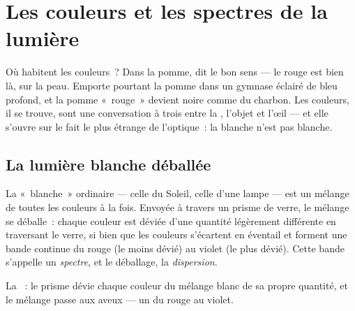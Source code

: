 \chapter{Les couleurs et les spectres de la lumière}\label{ch:g8:colors-spectra}

Où habitent les couleurs~? Dans la pomme, dit le bon sens --- le rouge
est bien là, sur la peau. Emporte pourtant la pomme dans un gymnase
éclairé de bleu profond, et la pomme «~rouge~» devient noire comme du
charbon. Les couleurs, il se trouve, sont une conversation à trois
entre la , l'objet et l'œil --- et elle s'ouvre sur le fait le
plus étrange de l'optique~: la  blanche n'est pas blanche.

\section{La lumière blanche déballée}

\begin{proposition}\label{prop:g8:colors-spectra:mixture}
La  «~blanche~» ordinaire --- celle du Soleil, celle d'une
lampe --- est un mélange de toutes les couleurs à la fois. Envoyée à
travers un prisme de verre, le mélange se déballe~: chaque couleur est
déviée d'une quantité légèrement différente en traversant le verre, si
bien que les couleurs s'écartent en éventail et forment une bande
continue du rouge (le moins dévié) au violet (le plus dévié). Cette
bande s'appelle un \emph{spectre}, et le déballage, la
\emph{dispersion}.
\end{proposition}

\begin{omfigure}

{\small La ~: le prisme dévie chaque couleur du mélange
blanc de sa propre quantité, et le mélange passe aux aveux --- un
 du rouge au violet.}
\end{omfigure}

